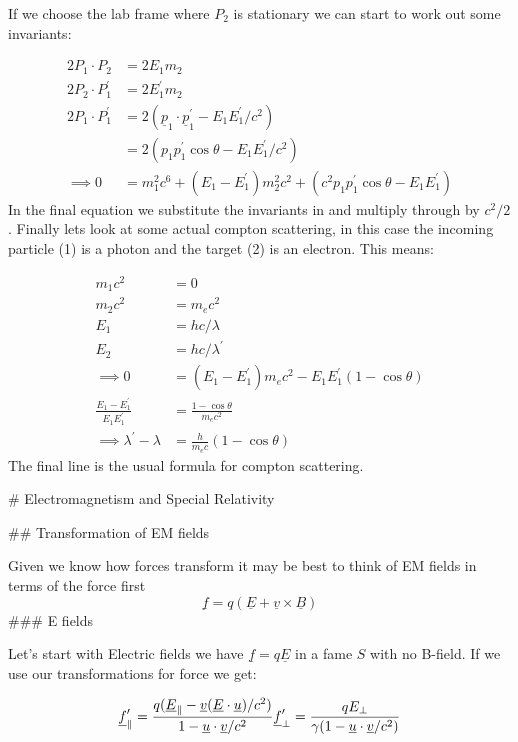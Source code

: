 If we choose the lab frame where $P_2$ is stationary we can start to work out some invariants:

$$
\begin{aligned}
    2P_1\cdot P_2 &= 2E_1m_2\\
    2P_2\cdot P^\prime_1 &= 2E_1^\prime m_2\\
    2P_1\cdot P^\prime_1 &= 2(\underline{p}_1\cdot\underline{p}_1^\prime - E_1E_1^\prime/c^2)\\
    &=2(p_1p^\prime_1\cos\theta - E_1E_1^\prime/c^2)\\
    \implies 0 &= m_1^2c^6 + (E_1-E_1^\prime)m_2^2c^2 + (c^2p_1p^\prime_1\cos\theta - E_1E_1^\prime)
\end{aligned}
$$
In the final equation we substitute the invariants in and multiply through by $c^2/2$. Finally lets look at some actual compton scattering, in this case the incoming particle (1) is a photon and the target (2) is an electron. This means:

$$
\begin{aligned}
    m_1c^2 &= 0\\
    m_2c^2 &= m_ec^2\\
    E_1 &= hc/\lambda\\
    E_2 &= hc/\lambda^\prime\\
    \implies0 &= (E_1 - E^\prime_1)m_ec^2 - E_1E^\prime_1(1-\cos\theta)\\
    \frac{E_1-E_1^\prime}{E_1E_1^\prime} &= \frac{1-\cos\theta}{m_ec^2}\\
    \implies \lambda^\prime - \lambda &= \frac{h}{m_ec}(1-\cos\theta)
\end{aligned}
$$
The final line is the usual formula for compton scattering.

# Electromagnetism and Special Relativity

## Transformation of EM fields

Given we know how forces transform it may be best to think of EM fields in terms of the force first
$$
\underline{f} = q(\underline{E} + \underline{v} \times \underline{B})
$$
### E fields

Let's start with Electric fields we have $\underline{f} = q\underline{E}$ in a fame $S$ with no B-field. If we use our transformations for force we get:

$$
\underline{f}_\parallel^\prime = \frac{q(\underline{E}_\parallel - \underline{v}(\underline{E}\cdot\underline{u})/c^2)}{1-\underline{u}\cdot\underline{v}/c^2}\\
\ \\
\underline{f}_\perp^\prime = \frac{qE_\perp}{\gamma(1-\underline{u}\cdot\underline{v}/c^2)}
$$

